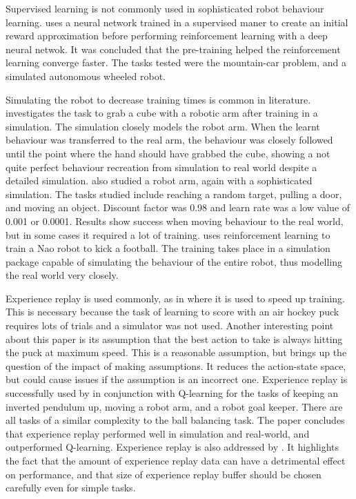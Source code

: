 \documentclass[12pt,a4paper]{article}
\begin{document}
Supervised learning is not commonly used in sophisticated robot behaviour learning. \cite{nn_then_dnn} uses a neural network trained in a supervised maner to create an initial reward approximation before performing reinforcement learning with a deep neural netwok. It was concluded that the pre-training helped the reinforcement learning converge faster. The tasks tested were the mountain-car problem, and a simulated autonomous wheeled robot.

Simulating the robot to decrease training times is common in literature. \cite{sim_robot_arm} investigates the task to grab a cube with a robotic arm after training in a simulation. The simulation closely models the robot arm. When the learnt behaviour was transferred to the real arm, the behaviour was closely followed until the point where the hand should have grabbed the cube, showing a not quite perfect behaviour recreation from simulation to real world despite a detailed simulation. \cite{arm_sim_door} also studied a robot arm, again with a sophisticated simulation. The tasks studied include reaching a random target, pulling a door, and moving an object. Discount factor was 0.98 and learn rate was a low value of 0.001 or 0.0001. Results show success when moving behaviour to the real world, but in some cases it required a lot of training. \cite{nao_football} uses reinforcement learning to train a Nao robot to kick a football. The training takes place in a simulation package capable of simulating the behaviour of the entire robot, thus modelling the real world very closely. 

Experience replay is used commonly, as in \cite{air_hockey} where it is used to speed up training. This is necessary because the task of learning to score with an air hockey puck requires lots of trials and a simulator was not used. Another interesting point about this paper is its assumption that the best action to take is always hitting the puck at maximum speed. This is a reasonable assumption, but brings up the question of the impact of making assumptions. It reduces the action-state space, but could cause issues if the assumption is an incorrect one. Experience replay is successfully used by \cite{er} in conjunction with Q-learning for the tasks of keeping an inverted pendulum up, moving a robot arm, and a robot goal keeper. There are all tasks of a similar complexity to the ball balancing task. The paper concludes that experience replay performed well in simulation and real-world, and outperformed Q-learning. Experience replay is also addressed by \cite{er_deeper}. It highlights the fact that the amount of experience replay data can have a detrimental effect on performance, and that size of experience replay buffer should be chosen carefully even for simple tasks.  
\end{document}
